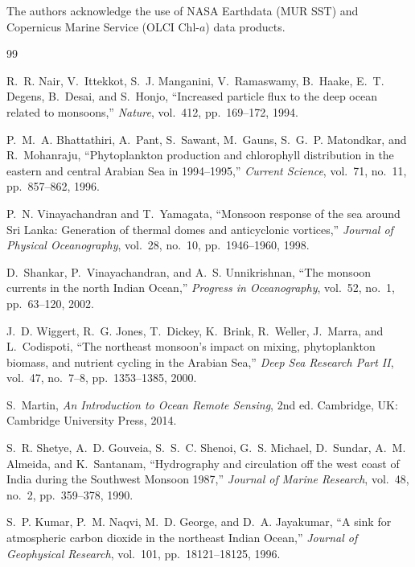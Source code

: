 \documentclass[journal]{IEEEtran}
\begin{document}
The authors acknowledge the use of NASA Earthdata (MUR SST) and
Copernicus Marine Service (OLCI Chl-$a$) data products.


\begin{thebibliography}{99}

R.~R. Nair, V.~Ittekkot, S.~J. Manganini, V.~Ramaswamy,
B.~Haake, E.~T. Degens, B.~Desai, and S.~Honjo,
``Increased particle flux to the deep ocean related to monsoons,''
\textit{Nature}, vol.~412, pp.~169--172, 1994.

P.~M.~A. Bhattathiri, A.~Pant, S.~Sawant, M.~Gauns,
S.~G.~P. Matondkar, and R.~Mohanraju,
``Phytoplankton production and chlorophyll distribution in the
eastern and central Arabian Sea in 1994--1995,''
\textit{Current Science}, vol.~71, no.~11, pp.~857--862, 1996.

P.~N. Vinayachandran and T.~Yamagata,
``Monsoon response of the sea around Sri Lanka:
Generation of thermal domes and anticyclonic vortices,''
\textit{Journal of Physical Oceanography}, vol.~28,
no.~10, pp.~1946--1960, 1998.

D.~Shankar, P.~Vinayachandran, and A.~S. Unnikrishnan,
``The monsoon currents in the north Indian Ocean,''
\textit{Progress in Oceanography}, vol.~52, no.~1,
pp.~63--120, 2002.

J.~D. Wiggert, R.~G. Jones, T.~Dickey, K.~Brink, R.~Weller,
J.~Marra, and L.~Codispoti,
``The northeast monsoon's impact on mixing, phytoplankton
biomass, and nutrient cycling in the Arabian Sea,''
\textit{Deep Sea Research Part II}, vol.~47, no.~7--8,
pp.~1353--1385, 2000.

S.~Martin, \textit{An Introduction to Ocean Remote Sensing},
2nd ed. Cambridge, UK: Cambridge University Press, 2014.

S.~R. Shetye, A.~D. Gouveia, S.~S.~C. Shenoi,
G.~S. Michael, D.~Sundar, A.~M. Almeida, and K.~Santanam,
``Hydrography and circulation off the west coast of India
during the Southwest Monsoon 1987,''
\textit{Journal of Marine Research}, vol.~48, no.~2,
pp.~359--378, 1990.

S.~P. Kumar, P.~M. Naqvi, M.~D. George, and D.~A. Jayakumar,
``A sink for atmospheric carbon dioxide in the northeast Indian
Ocean,'' \textit{Journal of Geophysical Research}, vol.~101,
pp.~18121--18125, 1996.


\end{thebibliography}
\end{document}
